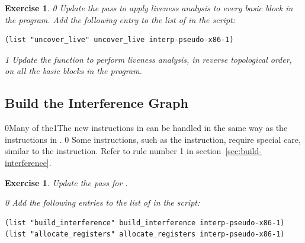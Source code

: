 \documentclass[7x10]{TimesAPriori_MIT}%
\def\racketEd{0}
\def\pythonEd{1}
\def\edition{1}
\def\xeightysixEd{0}
\def\riscvEd{1}
\def\architecture{1}
\newcommand\ifriscv[1]{\if\architecture\riscvEd{#1}\fi}
\newcommand\ifxeightsix[1]{\if\architecture\xeightysixEd{#1}\fi}
\newcommand{\pythonColor}[0]{}
\newtheorem{exercise}[theorem]{Exercise}
\numberwithin{theorem}{chapter}
\numberwithin{definition}{chapter}
\numberwithin{equation}{chapter}
\begin{document}
\begin{exercise}\normalfont\normalsize
{\if\edition\racketEd
%
Update the  pass to apply liveness analysis to
every basic block in the program.
%
Add the following entry to the list of  in the
 script:
\begin{lstlisting}
(list "uncover_live" uncover_live interp-pseudo-x86-1)
\end{lstlisting}
\fi}

{\if\edition\pythonEd\pythonColor
%
Update the  function to perform liveness analysis,
in reverse topological order, on all the basic blocks in the
program.
%  
\fi}
\end{exercise}

\subsection{Build the Interference Graph}
\label{sec:build-interference-Lif}

\ifxeightsix{Many of the}\ifriscv{The} new instructions in \LangXIfVar{} can be handled in the
same way as the instructions in \LangXVar{}.
%
\if\architecture\xeightysixEd
Some instructions, such as the  instruction, require special care,
similar to the  instruction. Refer to rule number 1 in
section~\ref{sec:build-interference}.
\fi

\begin{exercise}\normalfont\normalsize
Update the  pass for \LangXIfVar{}.
{\if\edition\racketEd
Add the following entries to the list of  in the
 script:
\begin{lstlisting}
(list "build_interference" build_interference interp-pseudo-x86-1)
(list "allocate_registers" allocate_registers interp-pseudo-x86-1)
\end{lstlisting}
\fi}
\end{exercise}
\end{document}
